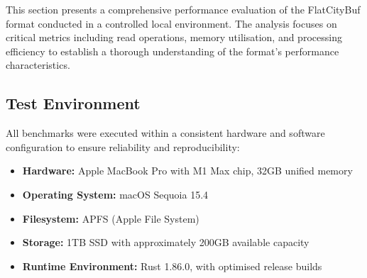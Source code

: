 This section presents a comprehensive performance evaluation of the FlatCityBuf format conducted in a controlled local environment. The analysis focuses on critical metrics including read operations, memory utilisation, and processing efficiency to establish a thorough understanding of the format's performance characteristics.

\subsection{Test Environment}
\label{result:benchmark_on_local_environment:test_environment}

All benchmarks were executed within a consistent hardware and software configuration to ensure reliability and reproducibility:

\begin{itemize}
  \item \textbf{Hardware:} Apple MacBook Pro with M1 Max chip, 32GB unified memory
  \item \textbf{Operating System:} macOS Sequoia 15.4
  \item \textbf{Filesystem:} APFS (Apple File System)
  \item \textbf{Storage:} 1TB SSD with approximately 200GB available capacity
  \item \textbf{Runtime Environment:} Rust 1.86.0, with optimised release builds
\end{itemize}






